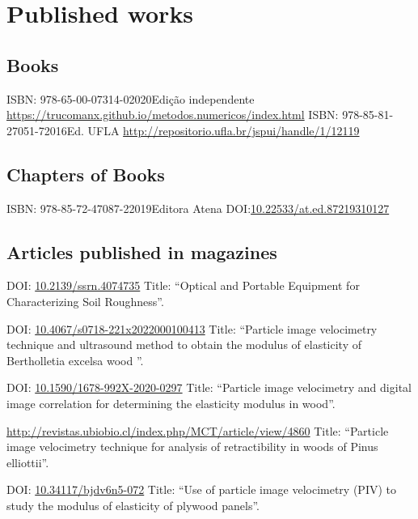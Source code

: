 \documentclass[11pt,a4paper,sans]{moderncv} %
\newcommand{\doiurl}[1]{\href{https://doi.org/#1}{#1}}
\begin{document}
\section{Published works}
\subsection{Books}
	      {ISBN: 978-65-00-07314-0}{2020}{Edição independente}
	      {\url{https://trucomanx.github.io/metodos.numericos/index.html}}
	      {ISBN: 978-85-81-27051-7}{2016}{Ed. UFLA}
	      {\url{http://repositorio.ufla.br/jspui/handle/1/12119}}

\subsection{Chapters of Books}
	      {ISBN: 978-85-72-47087-2}{2019}{Editora Atena}
	      {DOI:\doiurl{10.22533/at.ed.87219310127}}

\subsection{Articles published in magazines}

	      {DOI: \doiurl{10.2139/ssrn.4074735} }{}{}
	      {Title: ``Optical and Portable Equipment for Characterizing Soil Roughness''.}
	      
	      {DOI: \doiurl{10.4067/s0718-221x2022000100413} }{}{}
	      {Title: ``Particle image velocimetry technique and ultrasound method to obtain the modulus of elasticity of Bertholletia excelsa wood ''.}
	      
	      {DOI: \doiurl{10.1590/1678-992X-2020-0297} }{}{}
	      {Title: ``Particle image velocimetry and digital image correlation for determining the elasticity modulus in wood''.}
	      
	      {\url{http://revistas.ubiobio.cl/index.php/MCT/article/view/4860}}{}{}
	      {Title: ``Particle image velocimetry technique for analysis of retractibility in woods of Pinus elliottii''.}
	      
	      {DOI: \doiurl{10.34117/bjdv6n5-072}}{}{}
	      {Title: ``Use of particle image velocimetry (PIV) to study the modulus of elasticity of plywood panels''.}
\end{document}

